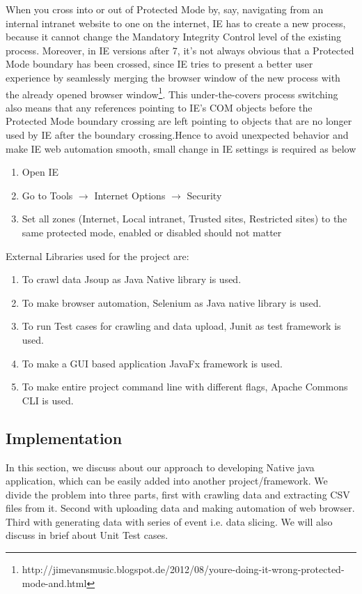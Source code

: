 \documentclass[article,type=msc,colorback,accentcolor=tud9c,twoside,11pt]{tudthesis}
\begin{document}
When you cross into or out of Protected Mode by, say, navigating from an internal intranet website to one on the internet, IE has to create a new process, because it cannot change the Mandatory Integrity Control level of the existing process. Moreover, in IE versions after 7, it's not always obvious that a Protected Mode boundary has been crossed, since IE tries to present a better user experience by seamlessly merging the browser window of the new process with the already opened browser window\footnote{http://jimevansmusic.blogspot.de/2012/08/youre-doing-it-wrong-protected-mode-and.html}. This under-the-covers process switching also means that any references pointing to IE's COM objects before the Protected Mode boundary crossing are left pointing to objects that are no longer used by IE after the boundary crossing.Hence to avoid unexpected behavior and make IE web automation smooth, small change in IE settings is required as below
\begin{enumerate}
\item Open IE
\item Go to Tools $\rightarrow$ {Internet Options} $\rightarrow$ {Security}
\item Set all zones (Internet, Local intranet, Trusted sites, Restricted sites) to the same protected mode, enabled or disabled should not matter
\end{enumerate}
External Libraries used for the project are:
\begin{enumerate}
\item To crawl data Jsoup as Java Native library is used.
\item To make browser automation, Selenium as Java native library is used.
\item To run Test cases for crawling and data upload, Junit as test framework is used. 
\item To make a GUI based application JavaFx framework is used.
\item To make entire project command line with different flags, Apache Commons CLI is used. 
\end{enumerate}

\subsection{Implementation}
In this section, we discuss about our approach to developing Native java application, which can be easily added into another project/framework. We divide the problem into three parts, first with crawling data and extracting CSV files from it. Second with uploading data and making automation of web browser. Third with generating data with series of event i.e. data slicing. We will also discuss in brief about Unit Test cases. 
\end{document}
